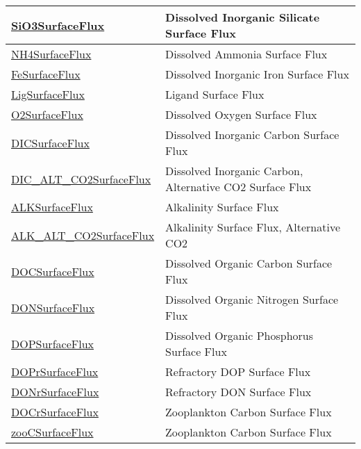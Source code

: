 {\begin{center}
\begin{longtable}{| p{2.0in} | p{4.0in} |}
    \hline
    \hyperref[subsec:var_sec_forcing_SiO3SurfaceFlux]{SiO3SurfaceFlux} & Dissolved Inorganic Silicate Surface Flux \\
    \hline
    \hyperref[subsec:var_sec_forcing_NH4SurfaceFlux]{NH4SurfaceFlux} & Dissolved Ammonia Surface Flux \\
    \hline
    \hyperref[subsec:var_sec_forcing_FeSurfaceFlux]{FeSurfaceFlux} & Dissolved Inorganic Iron Surface Flux \\
    \hline
    \hyperref[subsec:var_sec_forcing_LigSurfaceFlux]{LigSurfaceFlux} & Ligand Surface Flux \\
    \hline
    \hyperref[subsec:var_sec_forcing_O2SurfaceFlux]{O2SurfaceFlux} & Dissolved Oxygen Surface Flux \\
    \hline
    \hyperref[subsec:var_sec_forcing_DICSurfaceFlux]{DICSurfaceFlux} & Dissolved Inorganic Carbon Surface Flux \\
    \hline
    \hyperref[subsec:var_sec_forcing_DIC_ALT_CO2SurfaceFlux]{DIC\_ALT\_CO2SurfaceFlux} & Dissolved Inorganic Carbon, Alternative CO2 Surface Flux \\
    \hline
    \hyperref[subsec:var_sec_forcing_ALKSurfaceFlux]{ALKSurfaceFlux} & Alkalinity Surface Flux \\
    \hline
    \hyperref[subsec:var_sec_forcing_ALK_ALT_CO2SurfaceFlux]{ALK\_ALT\_CO2SurfaceFlux} & Alkalinity Surface Flux, Alternative CO2 \\
    \hline
    \hyperref[subsec:var_sec_forcing_DOCSurfaceFlux]{DOCSurfaceFlux} & Dissolved Organic Carbon Surface Flux \\
    \hline
    \hyperref[subsec:var_sec_forcing_DONSurfaceFlux]{DONSurfaceFlux} & Dissolved Organic Nitrogen Surface Flux \\
    \hline
    \hyperref[subsec:var_sec_forcing_DOPSurfaceFlux]{DOPSurfaceFlux} & Dissolved Organic Phosphorus Surface Flux \\
    \hline
    \hyperref[subsec:var_sec_forcing_DOPrSurfaceFlux]{DOPrSurfaceFlux} & Refractory DOP Surface Flux \\
    \hline
    \hyperref[subsec:var_sec_forcing_DONrSurfaceFlux]{DONrSurfaceFlux} & Refractory DON Surface Flux \\
    \hline
    \hyperref[subsec:var_sec_forcing_DOCrSurfaceFlux]{DOCrSurfaceFlux} & Zooplankton Carbon Surface Flux \\
    \hline
    \hyperref[subsec:var_sec_forcing_zooCSurfaceFlux]{zooCSurfaceFlux} & Zooplankton Carbon Surface Flux \\

\end{longtable}
\end{center}}
